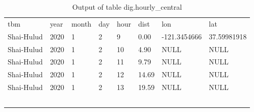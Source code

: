 \documentclass[a4paper,
							12pt,
							oneside,
							openright,
							DIV10,
							numbers=noendperiod
							]{scrreprt} %
\begin{document}
\begin{table}[ht]
\centering
\caption{Output of table dig.hourly\_central}
\label{tab:my-table}
\begin{tabular}{llllllll}
{\color[HTML]{000000} tbm} & {\color[HTML]{000000} year} & {\color[HTML]{000000} month} & {\color[HTML]{000000} day} & {\color[HTML]{000000} hour} & {\color[HTML]{000000} dist} & {\color[HTML]{000000} lon} & {\color[HTML]{000000} lat} \\
{\color[HTML]{000000} Shai-Hulud} & {\color[HTML]{000000} 2020} & {\color[HTML]{000000} 1} & {\color[HTML]{000000} 2} & {\color[HTML]{000000} 9} & {\color[HTML]{000000} 0.00} & {\color[HTML]{000000} -121.3454666} & {\color[HTML]{000000} 37.59981918} \\
{\color[HTML]{000000} Shai-Hulud} & {\color[HTML]{000000} 2020} & {\color[HTML]{000000} 1} & {\color[HTML]{000000} 2} & {\color[HTML]{000000} 10} & {\color[HTML]{000000} 4.90} & {\color[HTML]{000000} NULL} & {\color[HTML]{000000} NULL} \\
{\color[HTML]{000000} Shai-Hulud} & {\color[HTML]{000000} 2020} & {\color[HTML]{000000} 1} & {\color[HTML]{000000} 2} & {\color[HTML]{000000} 11} & {\color[HTML]{000000} 9.79} & {\color[HTML]{000000} NULL} & {\color[HTML]{000000} NULL} \\
{\color[HTML]{000000} Shai-Hulud} & {\color[HTML]{000000} 2020} & {\color[HTML]{000000} 1} & {\color[HTML]{000000} 2} & {\color[HTML]{000000} 12} & {\color[HTML]{000000} 14.69} & {\color[HTML]{000000} NULL} & {\color[HTML]{000000} NULL} \\
{\color[HTML]{000000} Shai-Hulud} & {\color[HTML]{000000} 2020} & {\color[HTML]{000000} 1} & {\color[HTML]{000000} 2} & {\color[HTML]{000000} 13} & {\color[HTML]{000000} 19.59} & {\color[HTML]{000000} NULL} & {\color[HTML]{000000} NULL} \\
{\color[HTML]{000000} } & {\color[HTML]{000000} } & {\color[HTML]{000000} } & {\color[HTML]{000000} } & {\color[HTML]{000000} } & {\color[HTML]{000000} } & {\color[HTML]{000000} } &  \\
{\color[HTML]{000000} } & {\color[HTML]{000000} } & {\color[HTML]{000000} } & {\color[HTML]{000000} } & {\color[HTML]{000000} } & {\color[HTML]{000000} } & {\color[HTML]{000000} } &  \\
{\color[HTML]{000000} } & {\color[HTML]{000000} } & {\color[HTML]{000000} } & {\color[HTML]{000000} } & {\color[HTML]{000000} } & {\color[HTML]{000000} } & {\color[HTML]{000000} } &  \\
{\color[HTML]{000000} } & {\color[HTML]{000000} } & {\color[HTML]{000000} } & {\color[HTML]{000000} } & {\color[HTML]{000000} } & {\color[HTML]{000000} } & {\color[HTML]{000000} } &  \\
{\color[HTML]{000000} } & {\color[HTML]{000000} } & {\color[HTML]{000000} } & {\color[HTML]{000000} } & {\color[HTML]{000000} } & {\color[HTML]{000000} } & {\color[HTML]{000000} } & 
\end{tabular}
\end{table}
\end{document}
